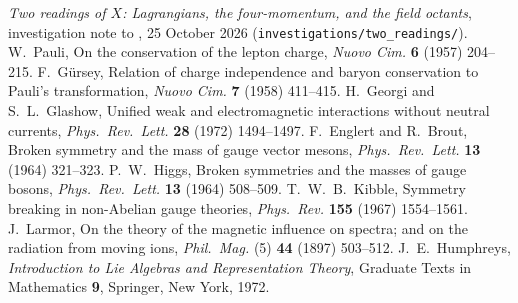  \emph{Two readings of $X$: Lagrangians, the four-momentum, and the field octants}, investigation note to \cite{ES17}, 25 October 2026 (\texttt{investigations/two\_readings/}).
 W.~Pauli, On the conservation of the lepton charge, \emph{Nuovo Cim.} \textbf{6} (1957) 204--215.
 F.~G\"ursey, Relation of charge independence and baryon conservation to Pauli's transformation, \emph{Nuovo Cim.} \textbf{7} (1958) 411--415.
 H.~Georgi and S.~L.~Glashow, Unified weak and electromagnetic interactions without neutral currents, \emph{Phys.\ Rev.\ Lett.} \textbf{28} (1972) 1494--1497.
 F.~Englert and R.~Brout, Broken symmetry and the mass of gauge vector mesons, \emph{Phys.\ Rev.\ Lett.} \textbf{13} (1964) 321--323.
 P.~W.~Higgs, Broken symmetries and the masses of gauge bosons, \emph{Phys.\ Rev.\ Lett.} \textbf{13} (1964) 508--509.
 T.~W.~B.~Kibble, Symmetry breaking in non-Abelian gauge theories, \emph{Phys.\ Rev.} \textbf{155} (1967) 1554--1561.
 J.~Larmor, On the theory of the magnetic influence on spectra; and on the radiation from moving ions, \emph{Phil.\ Mag.} (5) \textbf{44} (1897) 503--512.
 J.~E.~Humphreys, \emph{Introduction to Lie Algebras and Representation Theory}, Graduate Texts in Mathematics \textbf{9}, Springer, New York, 1972.
